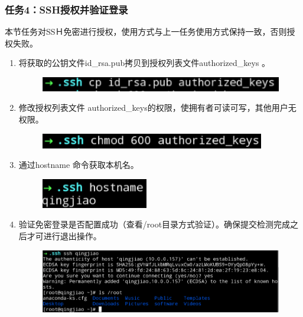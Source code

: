 \documentclass {article}
\begin{document}
			\subsubsection{任务4：SSH授权并验证登录}
				本节任务对SSＨ免密进行授权，使用方式与上一任务使用方式保持一致，否则授权失败。
				\begin{enumerate}
					\item 将获取的公钥文件id\_rsa.pub拷贝到授权列表文件authorized\_keys 。
						\begin{figure}[H]
							\centering
							\includegraphics{figures/fig13.jpg}
						\end{figure}
					
					\item 修改授权列表文件 authorized\_keys的权限，使拥有者可读可写，其他用户无权限。
						\begin{figure}[H]
							\centering
							\includegraphics{figures/fig14.jpg}
						\end{figure}
					
					\item 通过hostname 命令获取本机名。
						\begin{figure}[H]
							\centering
							\includegraphics{figures/fig15.jpg}
						\end{figure}
					
					\item 验证免密登录是否配置成功（查看/root目录方式验证）。确保提交检测完成之后才可进行退出操作。
						\begin{figure}[H]
							\centering
							\includegraphics[width=4.5in]{figures/fig16.jpg} 
						\end{figure}
				\end{enumerate}
\end{document}
